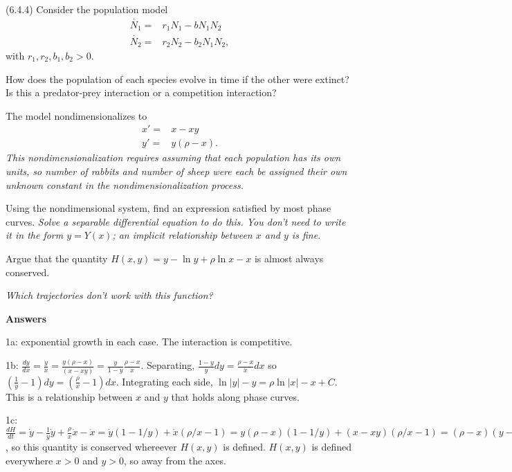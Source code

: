 \documentclass[12pt,letterpaper,noanswers]{exam}
\begin{document}
\begin{questions}
\item (6.4.4) Consider the population model
  \begin{align*}
 \dot{N_1} = & r_1 N_1 - b N_1 N_2 \\
 \dot{N_2} = & r_2 N_2 - b_2 N_1 N_2,
 \end{align*}
 with $r_1, r_2, b_1, b_2 > 0$.
 
 \begin{parts}
 \item How does the population of each species evolve in time if the other were extinct?  Is this a predator-prey interaction or a competition interaction?
 \item The model nondimensionalizes to 
  \begin{align*}
 x' = & x - x y \\
 y' = &y(\rho - x).
 \end{align*}
 \emph{This nondimensionalization requires assuming that each population has its own units, so number of rabbits and number of sheep were each be assigned their own unknown constant in the nondimensionalization process.}

Using the nondimensional system, find an expression satisfied by most phase curves.  %
 \emph{Solve a separable differential equation to do this.  You don't need to write it in the form $y = Y(x)$; an implicit relationship between $x$ and $y$ is fine.}
 
 \item Argue that the quantity $H(x,y) = y - \ln y + \rho \ln x - x$ is almost always conserved.
 
 \textit{Which trajectories don't work with this function?}

\end{parts}
\end{questions}

\eject

\textbf{Answers}

1a: exponential growth in each case.  The interaction is competitive.

1b: $\frac{dy}{dx} = \frac{\dot y}{\dot x} = \frac{y(\rho-x)}{(x-xy)} = \frac{y}{1-y}\frac{\rho-x}{x}.$  Separating, $\frac{1-y}{y} dy = \frac{\rho-x}{x}dx$ so $(\frac{1}{y} - 1)dy = (\frac{\rho}{x} -1) dx$.  Integrating each side, $\ln\vert y\vert - y = \rho\ln\vert x\vert - x + C$.  This is a relationship between $x$ and $y$ that holds along phase curves.

1c: $\frac{dH}{dt} = \dot{y} - \frac{1}{y}\dot{y} + \frac{\rho}{x}\dot{x} - \dot{x} = \dot{y}(1- 1/y) + \dot{x}(\rho/x - 1) = y(\rho-x)(1-1/y) + (x-xy)(\rho/x - 1) = (\rho-x)(y-1) + (1-y)(\rho-x) = 0$, so this quantity is conserved whereever $H(x,y)$ is defined.  $H(x,y)$ is defined everywhere $x> 0$ and $y> 0$, so away from the axes.
\end{document}
